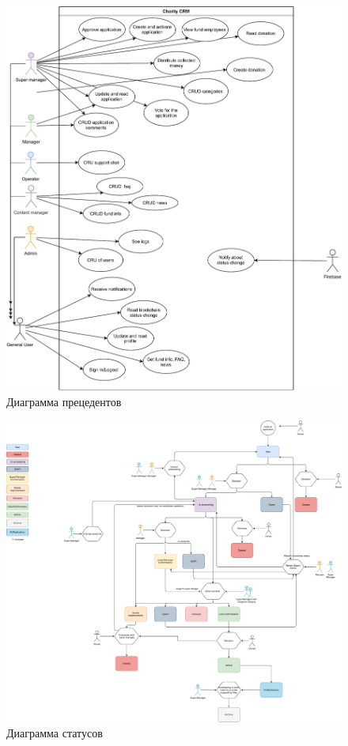\documentclass[a4paper,12pt,reqno]{article}
\begin{document}
	                    \newpage
	\begin{figure}[H]
		\centering
		\includegraphics[width = 0.9\linewidth]{img/usecase.pdf}
		\caption{Диаграмма прецедентов}
		\label{pic: status}
	\end{figure}
	
	                    \newpage
	
	\begin{figure}[H]
		\centering
		\includegraphics[width = 0.9\linewidth]{img/statusflow.pdf}
		\caption{Диаграмма статусов}
		\label{pic: status}
	\end{figure}
	
\end{document}
